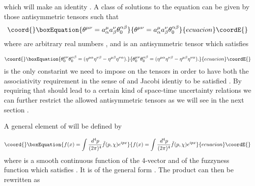 \documentclass[a4paper,12pt]{article}
\begin{document}
which will make \coordHE{} an identity . A class of  solutions to
the equation \coordHE{} can be given by those antisymmetric tensors
\myHighlight{${\theta}$}\coordHE{} such that
\begin{equation}\coord{}\boxEquation{
{\theta}^{{\mu}{\nu}}={a}^{\mu}_{\alpha}{a}^{\nu}_{\beta}{\theta}_0^{{\alpha}{\beta}}
}{
{\theta}^{{\mu}{\nu}}={a}^{\mu}_{\alpha}{a}^{\nu}_{\beta}{\theta}_0^{{\alpha}{\beta}}
}{ecuacion}\coordE{}\end{equation}
where \coordHE{} are arbitrary real numbers , and \coordHE{} is an antisymmetric tensor which satisfies

\begin{equation}\coord{}\boxEquation{
{\theta}_0^{{\mu}{\nu}}{\theta}_0^{{\alpha}{\beta}}=({\eta}^{{\mu}{\alpha}}{\eta}^{{\nu}{\beta}} - {\eta}^{{\mu}{\beta}}{\eta}^{{\nu}{\alpha}}).
}{
{\theta}_0^{{\mu}{\nu}}{\theta}_0^{{\alpha}{\beta}}=({\eta}^{{\mu}{\alpha}}{\eta}^{{\nu}{\beta}} - {\eta}^{{\mu}{\beta}}{\eta}^{{\nu}{\alpha}}).
}{ecuacion}\coordE{}\end{equation}
\coordHE{} is the only constarint we need to impose on the tensors
\myHighlight{$\theta$}\coordHE{} in order to have both the associativity requirement in
the sense of \coordHE{} and Jacobi identiy \coordHE{} to be satisfied
. By requiring that \coordHE{} should lead to a certain kind of
space-time uncertainty relations we can further restrict the
allowed antisymmetric tensors \myHighlight{${\theta}$}\coordHE{} as we will see in the
next section .





\vskip 5mm
\vskip 5mm
\noindent

A general element \coordHE{} of \coordHE{} will be
defined by

\begin{equation}\coord{}\boxEquation{
f(x)=\int \frac{d^4p}{(2{\pi})^4}\tilde{f}(p,\chi) e^{ipx}
}{
f(x)=\int \frac{d^4p}{(2{\pi})^4}\tilde{f}(p,\chi) e^{ipx}
}{ecuacion}\coordE{}\end{equation}
where \coordHE{} is a smooth continuous function of the 4-vector
\coordHE{} and of the fuzzyness function \myHighlight{$\chi$}\coordHE{} which satisfies
\coordHE{} . It is of the general
form \coordHE{} . The \myHighlight{$*$}\coordHE{} product \coordHE{} can then be
rewritten as
\end{document}
